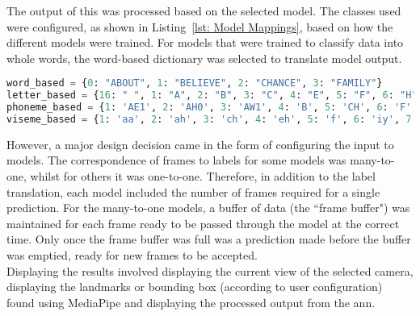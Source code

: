The output of this was processed based on the selected model. The classes used were configured, as shown in Listing~\ref{lst: Model Mappings}, based on how the different models were trained. For models that were trained to classify data into whole words, the word-based dictionary was selected to translate model output.\\
\begin{lstlisting}[language=Python, caption={[The label mappings used for the different models.]{The label mappings used for the different models. This shows the mapping from the model output to the word labels for each different model output type.}}, label={lst: Model Mappings}]
word_based = {0: "ABOUT", 1: "BELIEVE", 2: "CHANCE", 3: "FAMILY"}
letter_based = {16: " ", 1: "A", 2: "B", 3: "C", 4: "E", 5: "F", 6: "H", 7: "I", 8: "L", 9: "M", 10: "N", 11: "O", 12: "T", 13: "U", 14: "V", 15: "Y",}
phoneme_based = {1: 'AE1', 2: 'AH0', 3: 'AW1', 4: 'B', 5: 'CH', 6: 'F', 7: 'IH0', 8: 'IY0', 9: 'IY1', 10: 'L', 11: 'M', 12: 'N', 13: 'S', 14: 'T', 15: 'V', 16: ' '}
viseme_based = {1: 'aa', 2: 'ah', 3: 'ch', 4: 'eh', 5: 'f', 6: 'iy', 7: 'k', 8: 'p', 9: 't', 10: 'uh', 11: ' '}
\end{lstlisting}
However, a major design decision came in the form of configuring the input to models. The correspondence of frames to labels for some models was many-to-one, whilst for others it was one-to-one. Therefore, in addition to the label translation, each model included the number of frames required for a single prediction. For the many-to-one models, a buffer of data (the ``frame buffer") was maintained for each frame ready to be passed through the model at the correct time. Only once the frame buffer was full was a prediction made before the buffer was emptied, ready for new frames to be accepted.\\
Displaying the results involved displaying the current view of the selected camera, displaying the landmarks or bounding box (according to user configuration) found using MediaPipe and displaying the processed output from the \acrshort{ann}.
